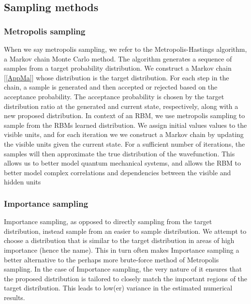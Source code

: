 \documentclass{article}
\begin{document}
\subsection{Sampling methods}
\subsubsection{Metropolis sampling}
When we say metropolis sampling, we refer to the Metropolis-Hastings algorithm, a Markov chain Monte Carlo method. The algorithm generates a sequence of samples from a target probability distribution. We construct a Markov chain [\ref{AppMa}] whose distribution is the target distribution. For each step in the chain, a sample is generated and then accepted or rejected based on the acceptance probability. The acceptance probability is chosen by the target distribution ratio at the generated and current state, respectively, along with a new proposed distribution.
\newline
In context of an RBM, we use metropolis sampling to sample from the RBMs learned distribution. We assign initial values values to the visible units, and for each iteration we we construct a Markov chain by updating the visible units given the current state. For a sufficient number of iterations, the samples will then approximate the true distribution of the wavefunction. This allows us to better model quantum mechanical systems, and allows the RBM to better model complex correlations and dependencies between the visible and hidden units
\newpage
\subsubsection{Importance sampling}
Importance sampling, as opposed to directly sampling from the target distribution, instead sample from an easier to sample distribution. We attempt to choose a distribution that is similar to the target distribution in areas of high importance (hence the name). This in turn often makes Importance sampling a better alternative to the perhaps more brute-force method of Metropolis sampling. In the case of Importance sampling, the very nature of it ensures that the proposed distribution is tailored to closely match the important regions of the target distribution. This leads to low(er) variance in the estimated numerical results.
\end{document}
